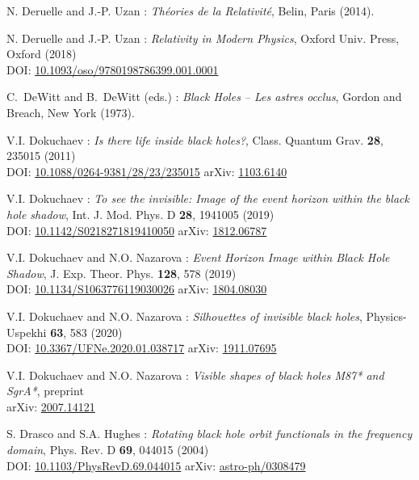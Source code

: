 \begin{thebibliography}{123}
N. Deruelle and J.-P. Uzan : {\em Th\'eories de la Relativit\'e},
Belin, Paris (2014).

N. Deruelle and J.-P. Uzan : {\em Relativity in Modern Physics},
Oxford Univ. Press, Oxford (2018)\\
DOI: \href{https://doi.org/10.1093/oso/9780198786399.001.0001}{10.1093/oso/9780198786399.001.0001}

C.~DeWitt and B.~DeWitt (eds.) :
{\em Black Holes -- Les astres occlus},
Gordon and Breach, New York (1973).

V.I. Dokuchaev : {\em Is there life inside black holes?},
Class. Quantum Grav. {\bf 28}, 235015 (2011)\\
DOI: \href{https://doi.org/10.1088/0264-9381/28/23/235015}{10.1088/0264-9381/28/23/235015}\hfill
arXiv: \href{https://arxiv.org/abs/1103.6140}{1103.6140}

V.I. Dokuchaev : {\em To see the invisible: Image of the event horizon within the black hole shadow},
Int. J. Mod. Phys. D {\bf 28}, 1941005 (2019)\\
DOI: \href{https://doi.org/10.1142/S0218271819410050}{10.1142/S0218271819410050}\hfill
arXiv: \href{https://arxiv.org/abs/1812.06787}{1812.06787}

V.I. Dokuchaev and N.O. Nazarova : {\em Event Horizon Image within Black Hole Shadow},
J. Exp. Theor. Phys. {\bf 128}, 578 (2019)\\
DOI: \href{https://doi.org/10.1134/S1063776119030026}{10.1134/S1063776119030026}\hfill
arXiv: \href{https://arxiv.org/abs/1804.08030}{1804.08030}

V.I. Dokuchaev and N.O. Nazarova : {\em Silhouettes of invisible black holes},
Physics-Uspekhi {\bf 63}, 583 (2020)\\
DOI: \href{https://doi.org/10.3367/UFNe.2020.01.038717}{10.3367/UFNe.2020.01.038717}\hfill
arXiv: \href{https://arxiv.org/abs/1911.07695}{1911.07695}

V.I. Dokuchaev and N.O. Nazarova : {\em Visible shapes of black holes M87* and SgrA*},
preprint\\
arXiv: \href{https://arxiv.org/abs/2007.14121}{2007.14121}

S. Drasco and S.A. Hughes :
{\em Rotating black hole orbit functionals in the frequency domain},
Phys. Rev. D {\bf 69}, 044015 (2004)\\
DOI: \href{https://doi.org/10.1103/PhysRevD.69.044015}{10.1103/PhysRevD.69.044015}\hfill
arXiv: \href{https://arxiv.org/abs/astro-ph/0308479}{astro-ph/0308479}


\end{thebibliography}
